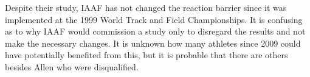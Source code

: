 \documentclass[12pt, letterpaper, titlepage]{article}
\begin{document}

Despite their study, IAAF has not changed the reaction barrier since it was
implemented at the 1999 World Track and Field Championships.  It is confusing
as to why IAAF would commission a study only to disregard the results and not
make the necessary changes.  It is unknown how many athletes since 2009 could
have potentially benefited from this, but it is probable that there are others
besides Allen who were disqualified.
\end{document}

